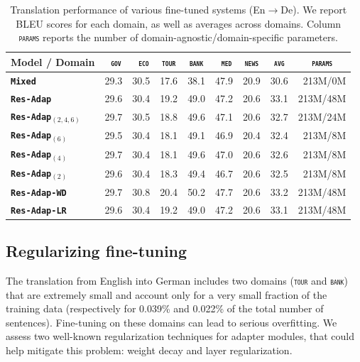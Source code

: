 \documentclass[11pt,a4paper]{article}
\newcommand{\fyDone}[1]{\done[FY]\Todo[FY:]{\textcolor{orange}{#1}}}
\newcommand{\domain}[1]{\texttt{\textsc{#1}}}
\newcommand{\system}[1]{\texttt{\textbf{#1}}}
\begin{document}
\begin{table}[htbp]
  \centering
  \fyDone{Fix column size}
  \begin{tabular}{|p{3cm}|*{8}{r|}} \hline
    Model / Domain & \multicolumn{1}{c|}{\domain{ gov}} & \multicolumn{1}{c|}{\domain{ eco}} & \multicolumn{1}{c|}{\domain{tour}} & \multicolumn{1}{c|}{\domain{bank}} & \multicolumn{1}{c|}{\domain{ med}} & \multicolumn{1}{c|}{\domain{news}} & \multicolumn{1}{c|}{\domain{avg}} & \multicolumn{1}{c|}{\domain{params}} \\ \hline
    \system{Mixed}          & 29.3 & 30.5 & 17.6 & 38.1 & 47.9 & 20.9  & 30.6 & 213M/0M\\
   \system{Res-Adap}     & 29.6 & 30.4 & 19.2 & 49.0 & 47.2 & 20.6 & 33.1 & 213M/48M \\ \hline
    \system{Res-Adap$_{(2,4,6)}$} & 29.7  & 30.5 & 18.8 & 49.6 & 47.1 & 20.6 &  32.7 & 213M/24M \\ 
    \system{Res-Adap$_{(6)}$}      & 29.5 & 30.4 & 18.1 & 49.1 & 46.9 & 20.4 & 32.4 & 213M/8M \\
   \system{Res-Adap$_{(4)}$}       & 29.7 & 30.4 & 18.1 & 49.6 & 47.0 & 20.6 & 32.6 & 213M/8M\\
   \system{Res-Adap$_{(2)}$}       & 29.6 & 30.4 & 18.3 & 49.4 & 46.7 & 20.6 & 32.5  & 213M/8M\\
   \hline
    \system{Res-Adap-WD}         & 29.7 & 30.8 & 20.4 & 50.2 & 47.7 & 20.6 & 33.2 & 213M/48M \\
    \system{Res-Adap-LR}           & 29.6 & 30.4 & 19.2 & 49.0 & 47.2 & 20.6 & 33.1  & 213M/48M\\
    \hline
  \end{tabular}
  \caption{Translation performance of various fine-tuned systems (En$\rightarrow$De). We report BLEU scores for each domain, as well as averages across domains. Column \domain{params} reports the number of domain-agnostic/domain-specific parameters.}
  \label{tab:performance-en-de-pos-reg}
\end{table}

\subsection{Regularizing fine-tuning \label{ssec:regularization-exp}}

The translation from English into German includes two domains (\domain{tour} and \domain{bank}) that are extremely small and account only for a very small fraction of the training data (respectively for 0.039\% and 0.022\% of the total number of sentences). Fine-tuning on these domains can lead to serious overfitting. We assess two well-known regularization techniques for adapter modules, that could help mitigate this problem: weight decay and layer regularization. 
\end{document}
